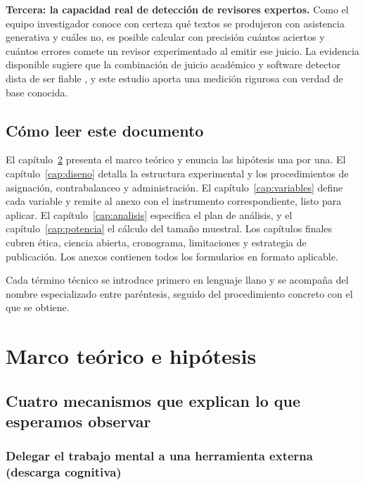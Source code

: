 \documentclass[12pt,a4paper,openany]{report}
\begin{document}
    \textbf{Tercera: la capacidad real de detecci\'on de revisores expertos.} Como el equipo investigador conoce con certeza qu\'e textos se produjeron con asistencia generativa y cu\'ales no, es posible calcular con precisi\'on cu\'antos aciertos y cu\'antos errores comete un revisor experimentado al emitir ese juicio. La evidencia disponible sugiere que la combinaci\'on de juicio acad\'emico y software detector dista de ser fiable \citep{perkins2024detection}, y este estudio aporta una medici\'on rigurosa con verdad de base conocida.
    
    \section{C\'omo leer este documento}
    
    El cap\'itulo~\ref{cap:marco} presenta el marco te\'orico y enuncia las hip\'otesis una por una. El cap\'itulo~\ref{cap:diseno} detalla la estructura experimental y los procedimientos de asignaci\'on, contrabalanceo y administraci\'on. El cap\'itulo~\ref{cap:variables} define cada variable y remite al anexo con el instrumento correspondiente, listo para aplicar. El cap\'itulo~\ref{cap:analisis} especifica el plan de an\'alisis, y el cap\'itulo~\ref{cap:potencia} el c\'alculo del tama\~no muestral. Los cap\'itulos finales cubren \'etica, ciencia abierta, cronograma, limitaciones y estrategia de publicaci\'on. Los anexos contienen todos los formularios en formato aplicable.
    
    Cada t\'ermino t\'ecnico se introduce primero en lenguaje llano y se acompa\~na del nombre especializado entre par\'entesis, seguido del procedimiento concreto con el que se obtiene.
    
    \chapter{Marco te\'orico e hip\'otesis}
    \label{cap:marco}
    
    \section{Cuatro mecanismos que explican lo que esperamos observar}
    
    \subsection{Delegar el trabajo mental a una herramienta externa (descarga cognitiva)}
    
\end{document}

